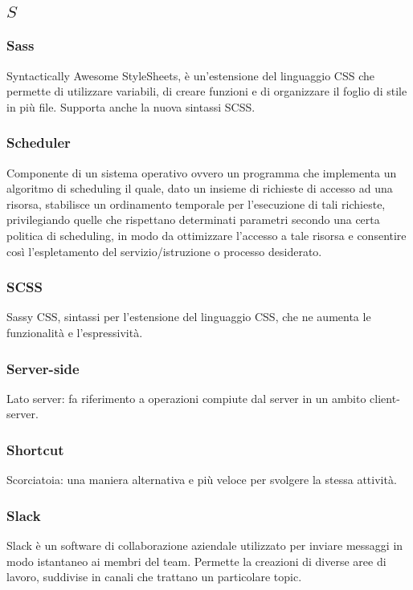 \subsection*{\quad$S\quad$}
\subsubsection*{Sass}
Syntactically Awesome StyleSheets, è un'estensione del linguaggio CSS che permette di utilizzare variabili, di creare funzioni e di organizzare il foglio di stile in più file. Supporta anche la nuova sintassi SCSS\glo.

\subsubsection*{Scheduler}
Componente di un sistema operativo ovvero un programma che implementa un algoritmo di scheduling il quale, dato un insieme di richieste di accesso ad una risorsa, stabilisce un ordinamento temporale per l'esecuzione di tali richieste, privilegiando quelle che rispettano determinati parametri secondo una certa politica di scheduling, in modo da ottimizzare l'accesso a tale risorsa e consentire così l'espletamento del servizio/istruzione o processo desiderato.

\subsubsection*{SCSS}
Sassy CSS, sintassi per l'estensione del linguaggio CSS, che ne aumenta le funzionalità e l'espressività.

\subsubsection*{Server-side}
Lato server: fa riferimento a operazioni compiute dal server in un ambito client-server. 

\subsubsection*{Shortcut}
Scorciatoia: una maniera alternativa e più veloce per svolgere la stessa attività.


\subsubsection*{Slack}
Slack è un software di collaborazione aziendale utilizzato per inviare messaggi in modo istantaneo ai membri del team. Permette la creazioni di diverse aree di lavoro, suddivise in canali che trattano un particolare topic.

